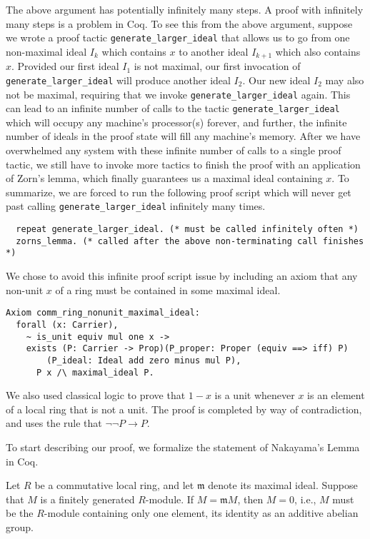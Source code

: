 \documentclass{article}
\begin{document}
The above argument has potentially infinitely many steps. A proof with infinitely
many steps is a problem in Coq. To see this from the above argument, suppose we
wrote a proof tactic \texttt{generate_larger_ideal} that allows us to
go from one non-maximal ideal \(I_{k}\) which contains \(x\) to another ideal
\(I_{k+1}\) which also contains \(x\). Provided our first ideal \(I_{1}\) is
not maximal, our first invocation of \texttt{generate_larger_ideal}
will produce another ideal \(I_{2}\). Our new ideal \(I_{2}\) may also not be
maximal, requiring that we invoke \texttt{generate_larger_ideal}
again. This can lead to an infinite number of calls to the tactic
\texttt{generate_larger_ideal} which will occupy any machine's
processor(s) forever, and further, the infinite number of ideals in the proof
state will fill any machine's memory. After we have overwhelmed any system with
these infinite number of calls to a single proof tactic, we still have to
invoke more tactics to finish the proof with an application of Zorn's lemma,
which finally guarantees us a maximal ideal containing \(x\). To summarize, we
are forced to run the following proof script which will never get past calling
\texttt{generate_larger_ideal} infinitely many times.
\begin{verbatim}
  repeat generate_larger_ideal. (* must be called infinitely often *)
  zorns_lemma. (* called after the above non-terminating call finishes *)
\end{verbatim}
We chose to avoid this infinite proof script issue by including an axiom that
any non-unit \(x\) of a ring must be contained in some maximal ideal.

\begin{verbatim}
Axiom comm_ring_nonunit_maximal_ideal:
  forall (x: Carrier),
    ~ is_unit equiv mul one x ->
    exists (P: Carrier -> Prop)(P_proper: Proper (equiv ==> iff) P)
    	(P_ideal: Ideal add zero minus mul P),
      P x /\ maximal_ideal P.
\end{verbatim} 

We also used classical logic to prove that \(1 - x\) is a unit whenever \(x\)
is an element of a local ring that is not a unit. The proof is completed by way
of contradiction, and uses the rule that \(\neg\neg P\rightarrow P\).

To start describing our proof, we formalize the statement of Nakayama's Lemma
in Coq.

\begin{nak*}
Let $R$ be a commutative local ring, and let $\mathfrak{m}$ denote its maximal
ideal. Suppose that $M$ is a finitely generated $R$-module. If
$M = \mathfrak{m} M$, then $M = 0$, i.e., $M$ must be the $R$-module containing
only one element, its identity as an additive abelian group. 
\end{nak*}
\end{document}
